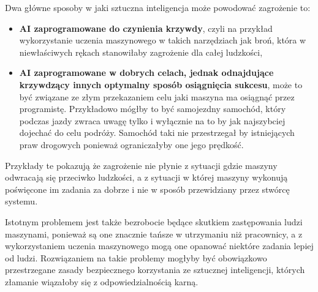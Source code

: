 Dwa główne sposoby w jaki sztuczna inteligencja może powodować zagrożenie to:
\begin{itemize}
    \item \textbf{AI zaprogramowane do czynienia krzywdy}, czyli na przykład wykorzystanie uczenia maszynowego
    w takich narzędziach jak broń, która w niewłaściwych rękach stanowiłaby zagrożenie dla całej ludzkości,
    \item \textbf{AI zaprogramowane w dobrych celach, jednak odnajdujące krzywdzący innych optymalny
    sposób osiągnięcia sukcesu}, może to być związane ze złym przekazaniem celu jaki maszyna ma osiągnąć przez 
    programistę. Przykładowo mógłby to być samojezdny samochód, który podczas jazdy zwraca uwagę tylko i wyłącznie 
    na to by jak najszybciej dojechać do celu podróży. Samochód taki nie przestrzegał by istniejących praw drogowych
    ponieważ ograniczałyby one jego prędkość.
\end{itemize}
Przykłady te pokazują że zagrożenie nie płynie z sytuacji gdzie maszyny odwracają się przeciwko ludzkości, a 
z sytuacji w której maszyny wykonują poświęcone im zadania za dobrze i nie w sposób przewidziany przez 
stwórcę systemu.

Istotnym problemem jest także bezrobocie będące skutkiem zastępowania ludzi maszynami,
ponieważ są one znacznie tańsze w utrzymaniu niż pracownicy, a z wykorzystaniem uczenia
maszynowego mogą one opanować niektóre zadania lepiej od ludzi.
Rozwiązaniem na takie problemy mogłyby być obowiązkowo przestrzegane zasady bezpiecznego korzystania
ze sztucznej inteligencji, których złamanie wiązałoby się z odpowiedzialnością karną.